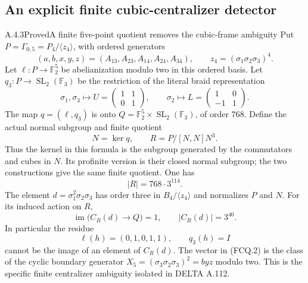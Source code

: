 \subsection{An explicit finite cubic-centralizer detector}
\label{sec:finite-cubic-detector}

\begin{result}{A.4.3}{Proved}{A finite five-point quotient removes the cubic-frame ambiguity}
Put $P=\Gamma_{0,5}=P_4/\langle z_4\rangle$, with ordered generators
\[
 (a,b,x,y,z)=(A_{13},A_{23},A_{14},A_{24},A_{34}),
 \qquad z_4=(\sigma _1\sigma _2\sigma _3)^4.
\]
Let $\ell:P\to\mathbb F_2^5$ be abelianization modulo two in this
ordered basis.  Let $q_3:P\to\operatorname{SL}_2(\mathbb F_3)$ be
the restriction of the literal braid representation
\[
 \sigma _1,\sigma _3\longmapsto U=
 \begin{pmatrix}1&1\\0&1\end{pmatrix},\qquad
 \sigma _2\longmapsto L=
 \begin{pmatrix}1&0\\-1&1\end{pmatrix}.
\]
The map $q=(\ell,q_3)$ is onto
$Q=\mathbb F_2^5\times\operatorname{SL}_2(\mathbb F_3)$, of order
$768$.  Define the actual normal subgroup and finite quotient
\[
 N=\ker q,\qquad R=P/[N,N]N^3.
\]
Thus the kernel in this formula is the subgroup generated by the
commutators and cubes in $N$.  Its profinite version is their closed
normal subgroup; the two constructions give the same finite quotient.
One has
\[
 |R|=768\cdot3^{114}.
\]
The element $d=\sigma _1^2\sigma _2\sigma _3$ has order three in
$B_4/\langle z_4\rangle$ and normalizes $P$ and $N$.  For its induced
action on $R$,
\[
 \operatorname{im}\bigl(C_R(d)\longrightarrow Q\bigr)=1,
 \qquad |C_R(d)|=3^{40}.                         \tag{FCQ.1}
\]
In particular the residue
\[
 \ell(h)=(0,1,0,1,1),\qquad q_3(h)=I              \tag{FCQ.2}
\]
cannot be the image of an element of $C_R(d)$.  The vector in
\textup{(FCQ.2)} is the class of the cyclic boundary generator
$X_5=(\sigma _3\sigma _2\sigma _3)^2=b y z$ modulo two.  This is the
specific finite centralizer ambiguity isolated in DELTA A.112.
\end{result}

